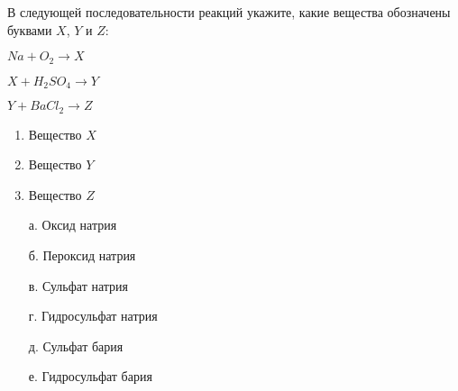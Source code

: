
В следующей последовательности реакций укажите, какие вещества
обозначены буквами $X$, $Y$ и $Z$:

$Na + O_2 \rightarrow X$

$X + H_2SO_4 \rightarrow Y$

$Y + BaCl_2 \rightarrow Z$

        \begin{enumerate}
            \item Вещество $X$
            \item Вещество $Y$
            \item Вещество $Z$
        \end{enumerate}

        \begin{enumerate}
            \item[а.] Оксид натрия
            \item[б.] Пероксид натрия
            \item[в.] Сульфат натрия
            \item[г.] Гидросульфат натрия
            \item[д.] Сульфат бария
            \item[е.] Гидросульфат бария   
        \end{enumerate}



